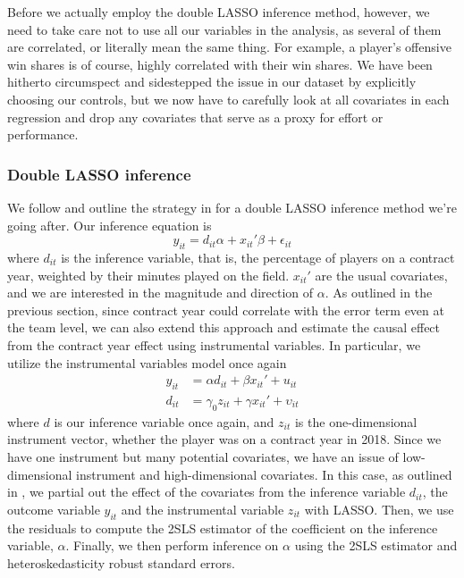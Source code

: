 \documentclass[12pt]{article}
\begin{document}
	Before we actually employ the double LASSO inference method, however, we need to take care not to use all our variables in the analysis, as several of them are correlated, or literally mean the same thing. For example, a player's offensive win shares is of course, highly correlated with their win shares. We have been hitherto circumspect and sidestepped the issue in our dataset by explicitly choosing our controls, but we now have to carefully look at all covariates in each regression and drop any covariates that serve as a proxy for effort or performance.
	
	\subsubsection{Double LASSO inference}
	
	We follow and outline the strategy in \cite{chernozhukov_high-dimensional_2016-1} for a double LASSO inference method we're going after. Our inference equation is \[
	y_{it} = d_{it} \alpha + x_{it}'\beta + \epsilon_{it}
	\] where $d_{it}$ is the inference variable, that is, the percentage of players on a contract year, weighted by their minutes played on the field. $x_{it}'$ are the usual covariates, and we are interested in the magnitude and direction of $\alpha$. As outlined in the previous section, since contract year could correlate with the error term even at the team level, we can also extend this approach and estimate the causal effect from the contract year effect using instrumental variables. In particular, we utilize the instrumental variables model once again \[
	\begin{aligned}
	y_{it} &= \alpha d_{it} + \beta x_{it}' + u_{it} \\
	d_{it} &= \gamma_0 z_{it} + \gamma x_{it}' + \upsilon_{it}
	\end{aligned}
	\] where $d$ is our inference variable once again, and $z_{it}$ is the one-dimensional instrument vector, whether the player was on a contract year in 2018. Since we have one instrument but many potential covariates, we have an issue of low-dimensional instrument and high-dimensional covariates. In this case, as outlined in \cite{chernozhukov_high-dimensional_2016-1}, we partial out the effect of the covariates from the inference variable $d_{it}$, the outcome variable $y_{it}$ and the instrumental variable $z_{it}$ with LASSO. Then, we use the residuals to compute the 2SLS estimator of the coefficient on the inference variable, $\alpha$. Finally, we then perform inference on $\alpha$ using the 2SLS estimator and heteroskedasticity robust standard errors.
	
\end{document}
